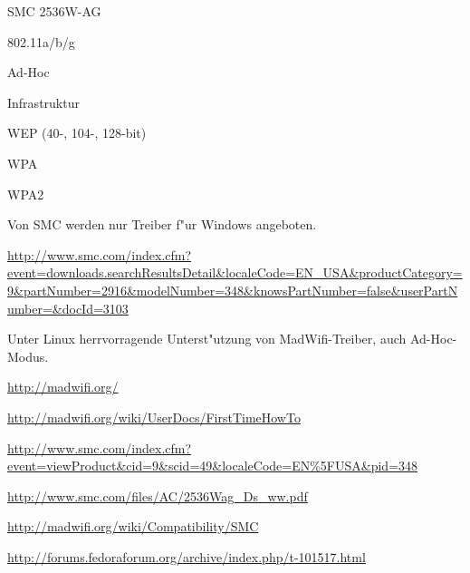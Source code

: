 %
%
\begin{wlandevice}{SMC 2536W-AG}



\begin{wlanieeestandard}
\item 802.11a/b/g
\end{wlanieeestandard}

\begin{wlanmode}
\item Ad-Hoc
\item Infrastruktur
\end{wlanmode}

\begin{wlansecurity}
\item WEP (40-, 104-, 128-bit)
\item WPA
\item WPA2
\end{wlansecurity}

\begin{wlandriver}
\item
Von SMC werden nur Treiber f"ur Windows angeboten.

\url{http://www.smc.com/index.cfm?event=downloads.searchResultsDetail&localeCode=EN_USA&productCategory=9&partNumber=2916&modelNumber=348&knowsPartNumber=false&userPartNumber=&docId=3103}

Unter Linux herrvorragende Unterst"utzung von MadWifi-Treiber,
auch Ad-Hoc-Modus.

\url{http://madwifi.org/}
\end{wlandriver}


\begin{wlaninstall}
\item
\url{http://madwifi.org/wiki/UserDocs/FirstTimeHowTo}
\end{wlaninstall}

\begin{wlanlink}
\item \url{http://www.smc.com/index.cfm?event=viewProduct&cid=9&scid=49&localeCode=EN\%5FUSA&pid=348}
\item \url{http://www.smc.com/files/AC/2536Wag_Ds_ww.pdf}
\item \url{http://madwifi.org/wiki/Compatibility/SMC}
\item \url{http://forums.fedoraforum.org/archive/index.php/t-101517.html}
\end{wlanlink}

\end{wlandevice}

